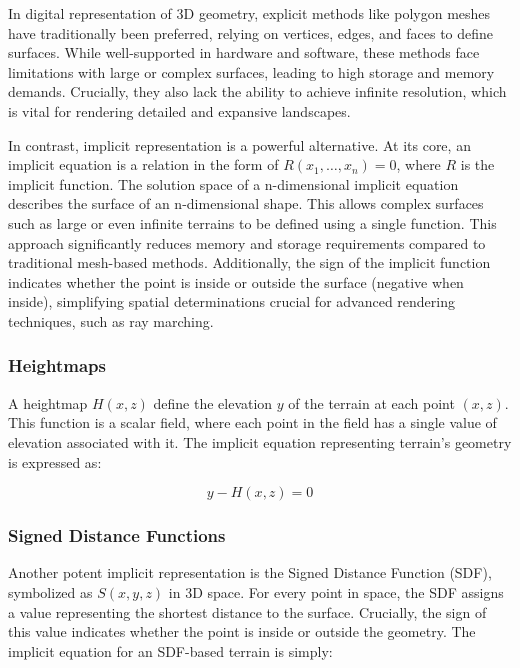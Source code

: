 In digital representation of 3D geometry, explicit methods like polygon meshes have traditionally been preferred, relying on vertices, edges, and faces to define surfaces. While well-supported in hardware and software, these methods face limitations with large or complex surfaces, leading to high storage and memory demands. Crucially, they also lack the ability to achieve infinite resolution, which is vital for rendering detailed and expansive landscapes.

In contrast, implicit representation is a powerful alternative. At its core, an implicit equation is a relation in the form of $R(x_1,\dots,x_n)=0$, where $R$ is the implicit function. The solution space of a n-dimensional implicit equation describes the surface of an n-dimensional shape. This allows complex surfaces such as large or even infinite terrains to be defined using a single function. This approach significantly reduces memory and storage requirements compared to traditional mesh-based methods. Additionally, the sign of the implicit function indicates whether the point is inside or outside the surface (negative when inside), simplifying spatial determinations crucial for advanced rendering techniques, such as ray marching.

\subsubsection{Heightmaps}
\label{Heightmap}

A heightmap $H(x,z)$ define the elevation $y$ of the terrain at each point $(x,z)$. This function is a scalar field, where each point in the field has a single value of elevation associated with it. The implicit equation representing terrain's geometry is expressed as:

\begin{equation}
y - H(x,z) = 0
\end{equation}


\subsubsection{Signed Distance Functions}
\label{SDF}

Another potent implicit representation is the Signed Distance Function (SDF), symbolized as $S(x,y,z)$ in 3D space. For every point in space, the SDF assigns a value representing the shortest distance to the surface. Crucially, the sign of this value indicates whether the point is inside or outside the geometry. The implicit equation for an SDF-based terrain is simply:

